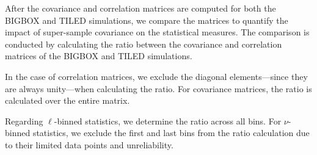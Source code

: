 After the covariance and correlation matrices are computed for both the BIGBOX and TILED simulations, we compare the matrices to quantify the impact of super-sample covariance on the statistical measures. The comparison is conducted by calculating the ratio between the covariance and correlation matrices of the BIGBOX and TILED simulations. 

In the case of correlation matrices, we exclude the diagonal elements---since they are always unity---when calculating the ratio. For covariance matrices, the ratio is calculated over the entire matrix. 

Regarding $\ell$-binned statistics, we determine the ratio across all bins. For $\nu$-binned statistics, we exclude the first and last bins from the ratio calculation due to their limited data points and unreliability.